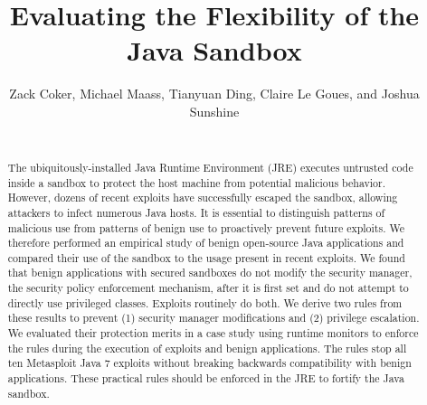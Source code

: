 \documentclass{sig-alternate}
\begin{document}
\lstset{language=Java}

\title{Evaluating the Flexibility of the Java Sandbox}

\author{\alignauthor Zack Coker, Michael Maass, Tianyuan Ding, Claire Le Goues, and Joshua Sunshine \\
 \\
} 

\maketitle
\begin{abstract}
The ubiquitously-installed Java Runtime Environment (JRE) executes
untrusted code inside a sandbox to protect the host machine from potential
malicious behavior. However, dozens of recent exploits have successfully
escaped the sandbox, allowing attackers to infect numerous
Java hosts. It is essential to distinguish patterns of malicious use
from patterns of benign use to proactively prevent future exploits.
We therefore performed an empirical study of benign open-source Java
applications and compared their use of the sandbox to the usage present
in recent exploits. We found that benign applications with secured
sandboxes do not modify the security manager, the security policy
enforcement mechanism, after it is first set and do not attempt to
directly use privileged classes. Exploits routinely do both. We derive 
two rules from these results to prevent (1) security manager 
modifications and (2) privilege escalation. We evaluated their protection merits 
in a case study using runtime monitors to enforce the rules during the 
execution of exploits and benign applications. The rules stop all ten 
Metasploit Java 7 exploits without breaking backwards compatibility 
with benign applications. These practical rules should be enforced 
in the JRE to fortify the Java sandbox.
\end{abstract}
\end{document}
